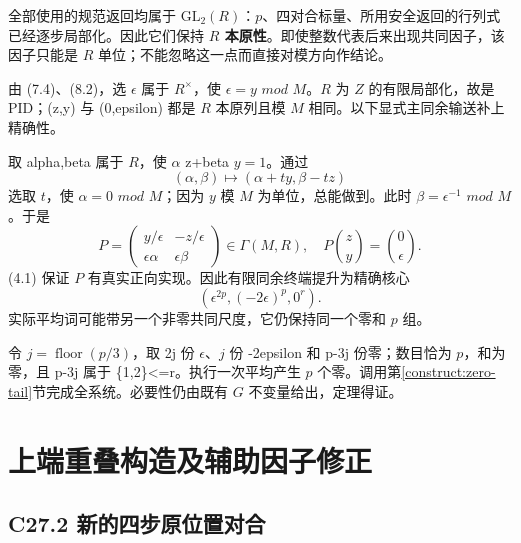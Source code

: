 {全部使用的规范返回均属于} {\ensuremath{\mathrm{GL}_{2}(R)}：\ensuremath{p}、四对合标量、所用安全返回的行列式已经逐步局部化。因此它们保持} \textbf{{\ensuremath{R}} {本原性}}{。即使整数代表后来出现共同因子，该因子只能是} {\ensuremath{R}} {单位；不能忽略这一点而直接对模方向作结论。}

{由} {(7.4)、(8.2)，选} {\ensuremath{\epsilon }} {属于} {\ensuremath{R^\times}，使} {\ensuremath{\epsilon =y}} {\ensuremath{mod}} {\ensuremath{M}。\ensuremath{R}} {为} {\ensuremath{Z}} {的有限局部化，故是} {PID；(z,y)} {与} {(0,epsilon)} {都是} {\ensuremath{R}} {本原列且模} {\ensuremath{M}} {相同。以下显式主同余输送补上精确性。}

{取} {alpha,beta} {属于} {\ensuremath{R}，使} {\ensuremath{\alpha }} {z+beta} {\ensuremath{y=1}。通过} \[
(\alpha,\beta)\mapsto(\alpha+ty,\beta-tz)
\] {选取} {\ensuremath{t}，使} {\ensuremath{\alpha =0}} {\ensuremath{mod}} {\ensuremath{M}；因为} {\ensuremath{y}} {模} {\ensuremath{M}} {为单位，总能做到。此时} {\ensuremath{\beta =\epsilon ^{-1}}} {\ensuremath{mod}} {\ensuremath{M}。于是} \[
P=\begin{pmatrix}
y/\epsilon&-z/\epsilon\\
\epsilon\alpha&\epsilon\beta
\end{pmatrix}
\in\Gamma(M,R),
\quad
P\binom zy=\binom0\epsilon.
\tag{C26.9.1}
\] {(4.1)} {保证} {\ensuremath{P}} {有真实正向实现。因此有限同余终端提升为精确核心} \[
(\epsilon^{2p},(-2\epsilon)^p,0^r).
\] {实际平均词可能带另一个非零共同尺度，它仍保持同一个零和} {\ensuremath{p}} {组。}

{令} {\ensuremath{j=\operatorname{floor}(p/3)}，取} {2j} {份} {\ensuremath{\epsilon }、\ensuremath{j}} {份} {-2epsilon} {和} {p-3j} {份零；数目恰为} {\ensuremath{p}，和为零，且} {p-3j} {属于} {\{1,2\}\textless=r。执行一次平均产生} {\ensuremath{p}} {个零。调用}第\ref{construct:zero-tail}节{完成全系统。必要性仍由既有} {\ensuremath{G}} {不变量给出，定理得证。}


\section{上端重叠构造及辅助因子修正}\label{construct:upper-overlap}
\subsection*{\texorpdfstring{{C27.2} {新的四步原位置对合}}{C27.2 新的四步原位置对合}}\label{C27-h168}

